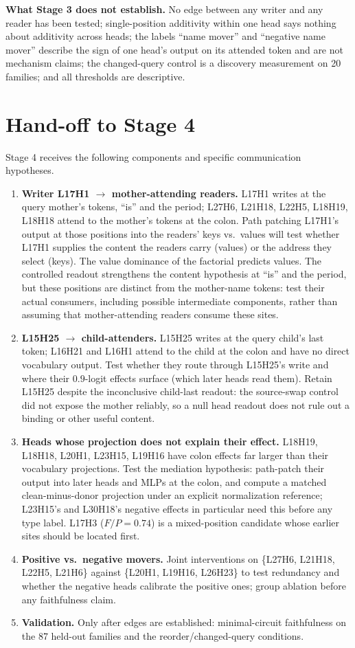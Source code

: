 \documentclass[11pt,a4paper]{article}
\begin{document}
\textbf{What Stage 3 does not establish.} No edge between any writer and any reader has
been tested; single-position additivity within one head says nothing about additivity
across heads; the labels ``name mover'' and ``negative name mover'' describe the sign of
one head's output on its attended token and are not mechanism claims; the changed-query
control is a discovery measurement on 20 families; and all thresholds are descriptive.

\section{Hand-off to Stage 4}
\label{sec:stage4}
Stage 4 receives the following components and specific communication hypotheses.

\begin{enumerate}
\item \textbf{Writer L17H1 $\rightarrow$ mother-attending readers.} L17H1 writes at
the query mother's tokens, ``is'' and the period; L27H6, L21H18, L22H5, L18H19,
L18H18 attend to the mother's tokens at the colon. Path patching L17H1's output at
those positions into the readers' keys vs.\ values will test whether L17H1 supplies the
content the readers carry (values) or the address they select (keys). The value
dominance of the factorial predicts values. The controlled readout strengthens the
content hypothesis at ``is'' and the period, but these positions are distinct from
the mother-name tokens: test their actual consumers, including possible intermediate
components, rather than assuming that mother-attending readers consume these sites.
\item \textbf{L15H25 $\rightarrow$ child-attenders.} L15H25 writes at the query child's
last token; L16H21 and L16H1 attend to the child at the colon and have no direct
vocabulary output. Test whether they route through L15H25's write and where their
$0.9$-logit effects surface (which later heads read them). Retain L15H25 despite the
inconclusive child-last readout: the source-swap control did not expose the mother
reliably, so a null head readout does not rule out a binding or other useful content.
\item \textbf{Heads whose projection does not explain their effect.} L18H19, L18H18,
L20H1, L23H15, L19H16 have colon effects far larger than their vocabulary projections.
Test the mediation hypothesis: path-patch their output into later heads and MLPs at the
colon, and compute a matched clean-minus-donor projection under an explicit
normalization reference; L23H15's and L30H18's negative effects in particular need this
before any type label. L17H3 ($F/P=0.74$) is a mixed-position candidate whose earlier
sites should be located first.
\item \textbf{Positive vs.\ negative movers.} Joint interventions on \{L27H6, L21H18,
L22H5, L21H6\} against \{L20H1, L19H16, L26H23\} to test redundancy and whether the
negative heads calibrate the positive ones; group ablation before any faithfulness
claim.
\item \textbf{Validation.} Only after edges are established: minimal-circuit
faithfulness on the 87 held-out families and the reorder/changed-query conditions.
\end{enumerate}
\end{document}
